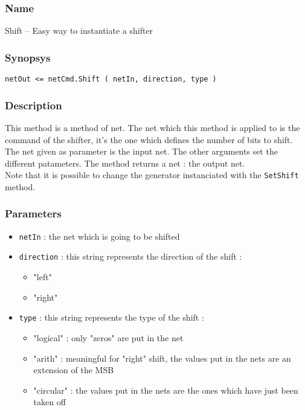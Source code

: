 \subsubsection{Name}

Shift -- Easy way to instantiate a shifter

\subsubsection{Synopsys}

\begin{verbatim}
netOut <= netCmd.Shift ( netIn, direction, type )
\end{verbatim}
  
\subsubsection{Description}

This method is a method of net. The net which this method is applied to is the command of the shifter, it's the one which defines the number of bits to shift. The net given as parameter is the input net. The other arguments set the different patameters. The method returns a net : the output net.\\
\indent Note that it is possible to change the generator instanciated with the \verb-SetShift- method.

\subsubsection{Parameters}

\begin{itemize}
    \item \verb-netIn- : the net which is going to be shifted
    \item \verb-direction- : this string represents the direction of the shift :
    \begin{itemize}
        \item "left"
        \item "right"
    \end{itemize}
    \item \verb-type- : this string represents the type of the shift :
    \begin{itemize}
        \item "logical" : only "zeros" are put in the net
        \item "arith" : meaningful for "right" shift, the values put in the nets are an extension of the MSB
        \item "circular" : the values put in the nets are the ones which have just been taken off
    \end{itemize}
\end{itemize}
          
